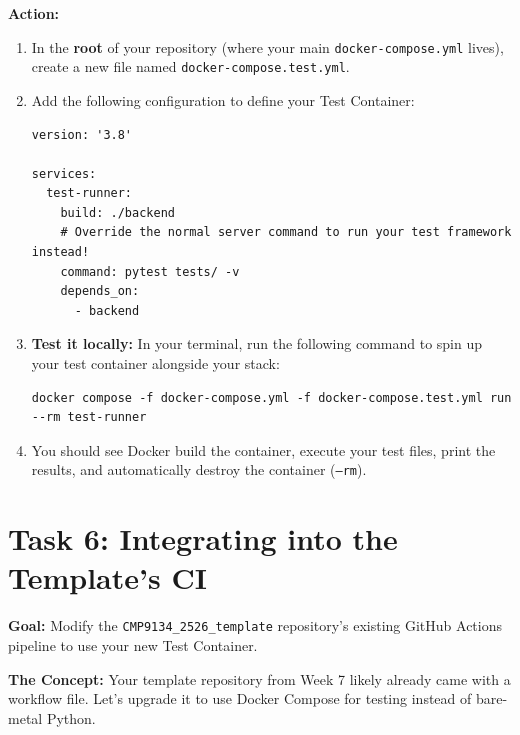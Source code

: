 \documentclass[a4paper,12pt]{article}
\begin{document}
\vspace{0.3cm}
\textbf{Action:}
\begin{enumerate}
    \item In the \textbf{root} of your repository (where your main \texttt{docker-compose.yml} lives), create a new file named \texttt{docker-compose.test.yml}.
    \item Add the following configuration to define your Test Container:
    \begin{verbatim}
version: '3.8'

services:
  test-runner:
    build: ./backend
    # Override the normal server command to run your test framework instead!
    command: pytest tests/ -v
    depends_on:
      - backend
    \end{verbatim}
    \item \textbf{Test it locally:} In your terminal, run the following command to spin up your test container alongside your stack:
    \begin{verbatim}
docker compose -f docker-compose.yml -f docker-compose.test.yml run --rm test-runner
    \end{verbatim}
    \item You should see Docker build the container, execute your test files, print the results, and automatically destroy the container (\texttt{--rm}).
\end{enumerate}


\section*{Task 6: Integrating into the Template's CI}

\textbf{Goal:} Modify the \texttt{CMP9134\_2526\_template} repository's existing GitHub Actions pipeline to use your new Test Container.

\textbf{The Concept:} Your template repository from Week 7 likely already came with a workflow file. Let's upgrade it to use Docker Compose for testing instead of bare-metal Python.
\end{document}
